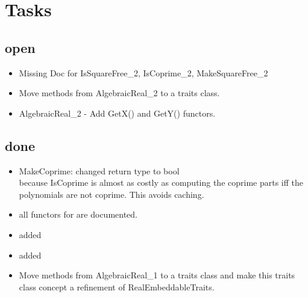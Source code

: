 
\section{Tasks}

\subsection{open}
\begin{itemize}
\item Missing Doc for IsSquareFree\_2, IsCoprime\_2, MakeSquareFree\_2
\item Move methods from AlgebraicReal\_2 to a traits class.
\item AlgebraicReal\_2 - Add GetX() and GetY() functors.
\end{itemize}

\subsection{done} 
\begin{itemize}
\item MakeCoprime: changed return type to bool\\
      because IsCoprime is almost as costly as computing the coprime
      parts iff the polynomials are not coprime. This avoids caching.  
\item all functors for  
      are documented.
\item added 
\item added  
\item Move methods from AlgebraicReal\_1 to a traits class and make
  this traits class concept a refinement of RealEmbeddableTraits.
\end{itemize}


